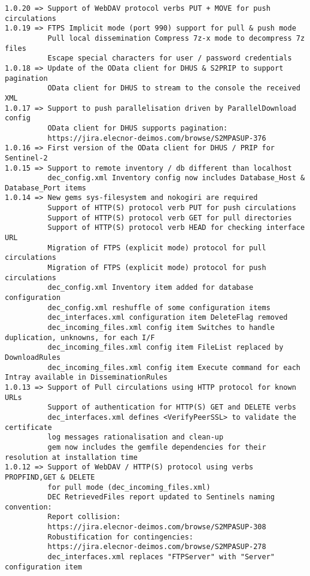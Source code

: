 \documentclass[dec_sum_main.tex]{subfiles}
\begin{document}
\begin{Verbatim}[tabsize=4]
1.0.20 => Support of WebDAV protocol verbs PUT + MOVE for push circulations
1.0.19 => FTPS Implicit mode (port 990) support for pull & push mode
          Pull local dissemination Compress 7z-x mode to decompress 7z files
          Escape special characters for user / password credentials
1.0.18 => Update of the OData client for DHUS & S2PRIP to support pagination
          OData client for DHUS to stream to the console the received XML
1.0.17 => Support to push parallelisation driven by ParallelDownload config
          OData client for DHUS supports pagination:
          https://jira.elecnor-deimos.com/browse/S2MPASUP-376
1.0.16 => First version of the OData client for DHUS / PRIP for Sentinel-2
1.0.15 => Support to remote inventory / db different than localhost
          dec_config.xml Inventory config now includes Database_Host & Database_Port items
1.0.14 => New gems sys-filesystem and nokogiri are required
          Support of HTTP(S) protocol verb PUT for push circulations
          Support of HTTP(S) protocol verb GET for pull directories
          Support of HTTP(S) protocol verb HEAD for checking interface URL
          Migration of FTPS (explicit mode) protocol for pull circulations
          Migration of FTPS (explicit mode) protocol for push circulations
          dec_config.xml Inventory item added for database configuration
          dec_config.xml reshuffle of some configuration items
          dec_interfaces.xml configuration item DeleteFlag removed
          dec_incoming_files.xml config item Switches to handle duplication, unknowns, for each I/F
          dec_incoming_files.xml config item FileList replaced by DownloadRules
          dec_incoming_files.xml config item Execute command for each Intray available in DisseminationRules
1.0.13 => Support of Pull circulations using HTTP protocol for known URLs
          Support of authentication for HTTP(S) GET and DELETE verbs
          dec_interfaces.xml defines <VerifyPeerSSL> to validate the certificate
          log messages rationalisation and clean-up
          gem now includes the gemfile dependencies for their resolution at installation time
1.0.12 => Support of WebDAV / HTTP(S) protocol using verbs PROPFIND,GET & DELETE
          for pull mode (dec_incoming_files.xml)
          DEC RetrievedFiles report updated to Sentinels naming convention:
          Report collision:
          https://jira.elecnor-deimos.com/browse/S2MPASUP-308
          Robustification for contingencies:
          https://jira.elecnor-deimos.com/browse/S2MPASUP-278
          dec_interfaces.xml replaces "FTPServer" with "Server" configuration item

\end{Verbatim}
\end{document}
